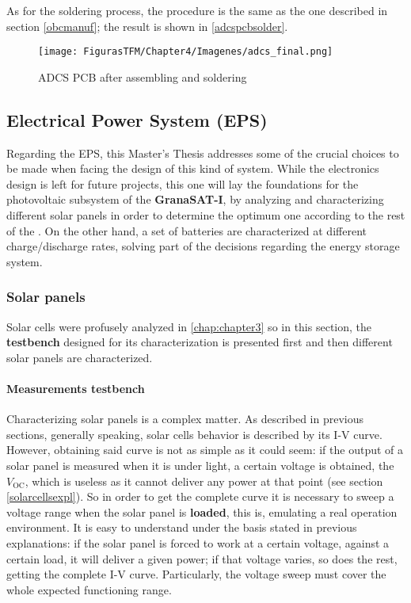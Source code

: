 As for the soldering process, the procedure is the same as the one described in section \ref{obcmanuf}; the result is shown in \autoref{adcspcbsolder}.

		\begin{figure} [H]
			\centering
			\texttt{[image: FigurasTFM/Chapter4/Imagenes/adcs\_final.png]}
			\caption{\acrshort{ADCS} \acrshort{PCB} after assembling and soldering} 	\label{adcspcbsolder}
			\vspace{-2cm}
\end{figure}



\newpage
\subsection{Electrical Power System (EPS)}

Regarding the \acrshort{EPS}, this Master's Thesis addresses some of the crucial choices to be made when facing the design of this kind of system. While the electronics design is left for future projects, this one will lay the foundations for the photovoltaic subsystem of the \textbf{GranaSAT-I}, by analyzing and characterizing different solar panels in order to determine the optimum one according to the rest of the . On the other hand, a set of batteries are characterized at different charge/discharge rates, solving part of the decisions regarding the energy storage system. 


\subsubsection{Solar panels}

Solar cells were profusely analyzed in \autoref{chap:chapter3} so in this section, the \textbf{testbench} designed for its characterization is presented first and then different solar panels are characterized.

\paragraph{Measurements testbench}

Characterizing solar panels is a complex matter. As described in previous sections, generally speaking, solar cells behavior is described by its I-V curve. However, obtaining said curve is not as simple as it could seem: if the output of a solar panel is measured when it is under light, a certain voltage is obtained, the $V_{\text{OC}}$, which is useless as it cannot deliver any power at that point (see section \ref{solarcellsexpl}). So in order to get the complete curve it is necessary to sweep a voltage range when the solar panel is \textbf{loaded}, this is, emulating a real operation environment. It is easy to understand under the basis stated in previous explanations: if the solar panel is forced to work at a certain voltage, against a certain load, it will deliver a given power; if that voltage varies, so does the rest, getting the complete I-V curve. Particularly, the voltage sweep must cover the whole expected functioning range. 

